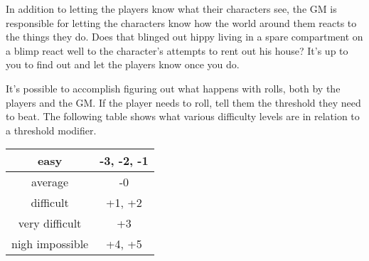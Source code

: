 \begin{flushleft}
In addition to letting the players know what their characters see, the GM is
responsible for letting the characters know how the world around them reacts
to the things they do. Does that blinged out hippy living in a spare
compartment on a blimp react well to the character's attempts to rent out his
house? It's up to you to find out and let the players know once you do.

It's possible to accomplish figuring out what happens with rolls, both by the
players and the GM. If the player needs to roll, tell them the threshold they
need to beat. The following table shows what various difficulty levels are
in relation to a threshold modifier.

\label{threshold_difficulties}
\begin{center}
\begin{tabular}{ |c|c|}
\hline
easy & -3, -2, -1 \\
\hline
average & -0 \\
\hline
difficult & +1, +2 \\
\hline
very difficult & +3 \\
\hline
nigh impossible & +4, +5 \\
\hline
\end{tabular}
\end{center}

\end{flushleft}
